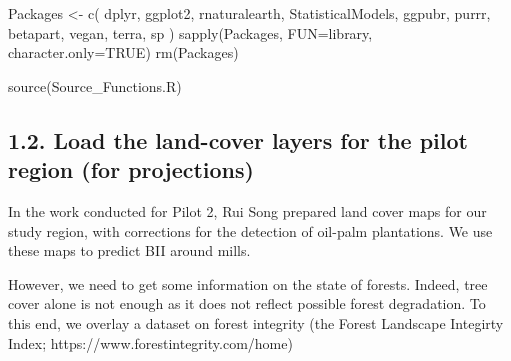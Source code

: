 \documentclass[
  letterpaper,
  DIV=11,
  numbers=noendperiod]{scrartcl}
\newenvironment{Shaded}{\begin{snugshade}}{\end{snugshade}}
\newcommand{\AttributeTok}[1]{\textcolor[rgb]{0.40,0.45,0.13}{#1}}
\newcommand{\ConstantTok}[1]{\textcolor[rgb]{0.56,0.35,0.01}{#1}}
\newcommand{\FunctionTok}[1]{\textcolor[rgb]{0.28,0.35,0.67}{#1}}
\newcommand{\NormalTok}[1]{\textcolor[rgb]{0.00,0.23,0.31}{#1}}
\newcommand{\OtherTok}[1]{\textcolor[rgb]{0.00,0.23,0.31}{#1}}
\newcommand{\StringTok}[1]{\textcolor[rgb]{0.13,0.47,0.30}{#1}}
\begin{document}
\begin{Shaded}
\begin{Highlighting}[]
\NormalTok{Packages }\OtherTok{\textless{}{-}} \FunctionTok{c}\NormalTok{(}
  \StringTok{\textquotesingle{}dplyr\textquotesingle{}}\NormalTok{,}
  \StringTok{\textquotesingle{}ggplot2\textquotesingle{}}\NormalTok{,}
  \StringTok{\textquotesingle{}rnaturalearth\textquotesingle{}}\NormalTok{,}
  \StringTok{\textquotesingle{}StatisticalModels\textquotesingle{}}\NormalTok{,}
  \StringTok{\textquotesingle{}ggpubr\textquotesingle{}}\NormalTok{,}
  \StringTok{\textquotesingle{}purrr\textquotesingle{}}\NormalTok{,}
  \StringTok{\textquotesingle{}betapart\textquotesingle{}}\NormalTok{,}
  \StringTok{\textquotesingle{}vegan\textquotesingle{}}\NormalTok{,}
  \StringTok{\textquotesingle{}terra\textquotesingle{}}\NormalTok{,}
  \StringTok{\textquotesingle{}sp\textquotesingle{}}
\NormalTok{)}
\FunctionTok{sapply}\NormalTok{(Packages, }\AttributeTok{FUN=}\NormalTok{library, }\AttributeTok{character.only=}\ConstantTok{TRUE}\NormalTok{)}
\FunctionTok{rm}\NormalTok{(Packages)}

\FunctionTok{source}\NormalTok{(}\StringTok{\textquotesingle{}Source\_Functions.R\textquotesingle{}}\NormalTok{)}
\end{Highlighting}
\end{Shaded}

\hypertarget{load-the-land-cover-layers-for-the-pilot-region-for-projections}{%
\subsection{1.2. Load the land-cover layers for the pilot region (for
projections)}\label{load-the-land-cover-layers-for-the-pilot-region-for-projections}}

In the work conducted for Pilot 2, Rui Song prepared land cover maps for
our study region, with corrections for the detection of oil-palm
plantations. We use these maps to predict BII around mills.

However, we need to get some information on the state of forests.
Indeed, tree cover alone is not enough as it does not reflect possible
forest degradation. To this end, we overlay a dataset on forest
integrity (the Forest Landscape Integirty Index;
https://www.forestintegrity.com/home)
\end{document}
